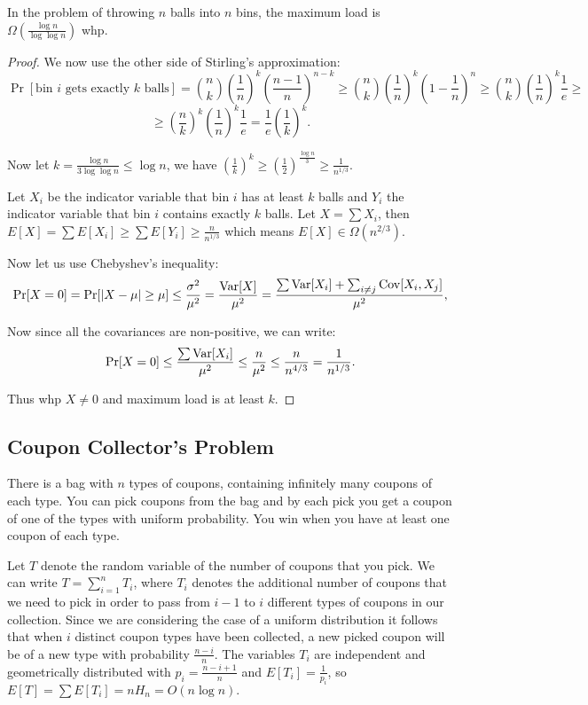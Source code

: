 \begin{proposition} In the problem of throwing $n$ balls into $n$ bins, the maximum load is $\Omega\left( \frac{\log n}{\log \log n} \right)$ whp.
\end{proposition}
\begin{proof}
We now use the other side of Stirling's approximation:
$$\Pr[\text{bin } i \text{ gets exactly } k \text{ balls}] = \binom{n}{k} \left( \frac{1}{n}\right)^k \left( \frac{n-1}{n}\right)^{n-k} \geq \binom{n}{k} \left( \frac{1}{n} \right)^k \left( 1 - \frac{1}{n}\right)^n \geq \binom{n}{k} \left(\frac{1}{n}\right)^k \frac{1}{e} \geq$$
$$
\geq \left(\frac{n}{k} \right)^k \left( \frac{1}{n} \right)^k \frac{1}{e} = \frac{1}{e} \left(  \frac{1}{k}\right)^k.
$$

Now let $k = \frac{\log n}{3 \log \log n} \leq \log n$, we have $\left( \frac{1}{k} \right)^k \geq \left(\frac{1}{2}\right)^{\frac{\log n}{3}} \geq \frac{1}{n^{1/3}}.$

Let $X_i$ be the indicator variable that bin $i$ has at least $k$ balls and $Y_i$ the indicator variable that bin $i$ contains exactly $k$ balls. Let $X = \sum X_i$, then $E[X] = \sum E[X_i] \geq \sum E[Y_i] \geq \frac{n}{n^{1/3}}$ which means $E[X] \in \Omega(n^{2/3}).$

Now let us use Chebyshev's inequality:
$$\Pr[X = 0] = \Pr[\vert X - \mu \vert \geq \mu] \leq \frac{\sigma^2}{\mu^2} = \frac{\mathrm{Var}[X]}{\mu^2} = \frac{\sum \mathrm{Var}[X_i] + \sum_{i \neq j} \mathrm{Cov}[X_i, X_j]}{\mu^2},$$

Now since all the covariances are non-positive, we can write:
$$\Pr[X = 0] \leq \frac{\sum \mathrm{Var}[X_i]}{\mu^2} \leq \frac{n}{\mu^2} \leq \frac{n}{n^{4/3}} = \frac{1}{n^{1/3}}.$$

Thus whp $X \neq 0$ and maximum load is at least $k$.

\end{proof}

\subsection{Coupon Collector's Problem}
There is a bag with $n$ types of coupons, containing infinitely many coupons of each type. You can pick coupons from the bag and by each pick you get a coupon of one of the types with uniform probability. You win when you have at least one coupon of each type.

Let $T$ denote the random variable of the number of coupons that you pick. We can write $T = \sum_{i=1}^{n} T_i$, where $T_i$ denotes the additional number of coupons that we need to pick in order to pass from $i-1$ to $i$ different types of coupons in our collection. Since we are considering the case of a uniform distribution it follows that when $i$ distinct coupon types have been collected, a new picked coupon will be of a new type with probability $\frac{n-i}{n}$. The variables $T_i$ are independent and geometrically distributed with $p_i = \frac{n-i+1}{n}$ and $E[T_i] = \frac{1}{p_i}$, so $E[T] = \sum E[T_i] = n H_n = O(n \log n).$ 

